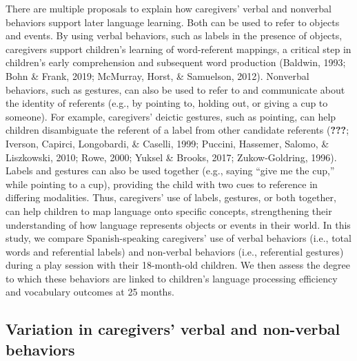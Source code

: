 \documentclass[
  english,
  man,mask]{apa6}
\begin{document}
There are multiple proposals to explain how caregivers' verbal and nonverbal behaviors support later language learning. Both can be used to refer to objects and events. By using verbal behaviors, such as labels in the presence of objects, caregivers support children's learning of word-referent mappings, a critical step in children's early comprehension and subsequent word production (Baldwin, 1993; Bohn \& Frank, 2019; McMurray, Horst, \& Samuelson, 2012). Nonverbal behaviors, such as gestures, can also be used to refer to and communicate about the identity of referents (e.g., by pointing to, holding out, or giving a cup to someone). For example, caregivers' deictic gestures, such as pointing, can help children disambiguate the referent of a label from other candidate referents ({\textbf{???}}; Iverson, Capirci, Longobardi, \& Caselli, 1999; Puccini, Hassemer, Salomo, \& Liszkowski, 2010; Rowe, 2000; Yuksel \& Brooks, 2017; Zukow-Goldring, 1996). Labels and gestures can also be used together (e.g., saying \enquote{give me the cup,} while pointing to a cup), providing the child with two cues to reference in differing modalities. Thus, caregivers' use of labels, gestures, or both together, can help children to map language onto specific concepts, strengthening their understanding of how language represents objects or events in their world. In this study, we compare Spanish-speaking caregivers' use of verbal behaviors (i.e., total words and referential labels) and non-verbal behaviors (i.e., referential gestures) during a play session with their 18-month-old children. We then assess the degree to which these behaviors are linked to children's language processing efficiency and vocabulary outcomes at 25 months.

\hypertarget{variation-in-caregivers-verbal-and-non-verbal-behaviors}{%
\subsection{Variation in caregivers' verbal and non-verbal behaviors}\label{variation-in-caregivers-verbal-and-non-verbal-behaviors}}
\end{document}

